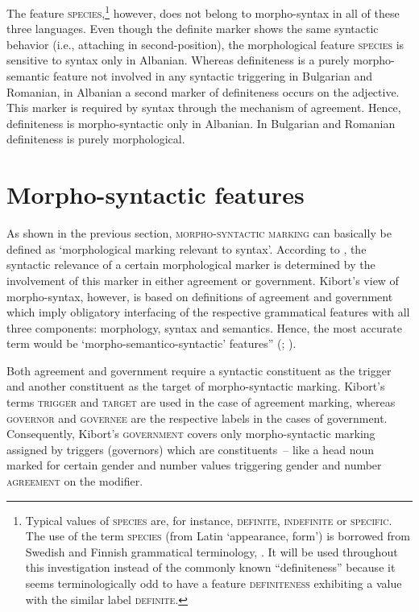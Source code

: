 The feature \textsc{species},\footnote{Typical values of \textsc{species} are, for instance, \textsc{definite, indefinite} or \textsc{specific}. The use of the term \textsc{species} (from Latin ‘appearance, form’) is borrowed from Swedish and Finnish grammatical terminology, \citep[cf., e.g.,][]{holm-etal1970,itkonen-t1980a}. It will be used throughout this investigation instead of the commonly known “definiteness” because it seems terminologically odd to have a feature \textsc{definiteness} exhibiting a value with the similar label \textsc{definite}.} however, does not belong to morpho-syntax in all of these three languages. Even though the definite marker shows the same syntactic behavior (i.e., attaching in second-position), the morphological feature \textsc{species} is sensitive to syntax only in Albanian. Whereas definiteness is a purely morpho-semantic feature not involved in any syntactic triggering in Bulgarian and Romanian, in Albanian a second marker of definiteness occurs on the adjective. This marker is required by syntax through the mechanism of agreement. Hence, definiteness is morpho-syntactic only in Albanian. In Bulgarian and Romanian definiteness is purely morphological.

\section{Morpho-syntactic features}
\label{crit eval}
As shown in the previous section, \textsc{morpho-syntactic marking} can basically be defined as ‘morphological marking relevant to syntax’. According to \citet{kibort2010a}, the syntactic relevance of a certain morphological marker is determined by the involvement of this marker in either agreement or government. Kibort's view of morpho-syntax, however, is based on definitions of agreement and government which imply obligatory interfacing of the respective grammatical features with all three components: morphology, syntax and semantics. Hence, the most accurate term would be ‘morpho-semantico-syntactic’ features” (\citealt{kibort2008a}; \citealt[cf.~also]{kibort2010a}).

Both agreement and government require a syntactic constituent as the trigger and another constituent as the target of morpho-syntactic marking. Kibort's terms \textsc{trigger} and \textsc{target} are used in the case of agreement marking, whereas \textsc{governor} and \textsc{governee} are the respective labels in the cases of government. Consequently, Kibort's \textsc{government} covers only morpho-syntactic marking assigned by triggers (governors) which are constituents~– like a head noun marked for certain gender and number values triggering gender and number \textsc{agreement} on the modifier.

